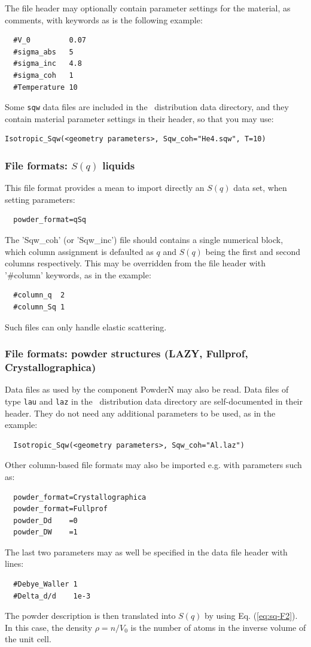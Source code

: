 The file header may optionally contain parameter settings for the material, as comments, with keywords as is the following example:
\begin{verbatim}
  #V_0         0.07
  #sigma_abs   5
  #sigma_inc   4.8
  #sigma_coh   1
  #Temperature 10
\end{verbatim}
Some \verb+sqw+ data files are included in the \MCS\ distribution data directory, and they contain material parameter settings in their header, so that you may use:
\begin{verbatim}
Isotropic_Sqw(<geometry parameters>, Sqw_coh="He4.sqw", T=10)
\end{verbatim}

\subsubsection{File formats: $S(q)$ liquids}

This file format provides a mean to import directly an $S(q)$ data set, when setting parameters:
\begin{verbatim}
  powder_format=qSq
\end{verbatim}
The 'Sqw\_coh' (or 'Sqw\_inc') file should contains a single numerical block, which column assignment is defaulted as $q$ and $S(q)$ being the first and second columns respectively. This may be overridden from the file header with '\#column' keywords, as in the example:
\begin{verbatim}
  #column_q  2
  #column_Sq 1
\end{verbatim}
Such files can only handle elastic scattering.

\subsubsection{File formats: powder structures (LAZY, Fullprof, Crystallographica)}

Data files as used by the component PowderN may also be read. Data files of type \verb'lau' and \verb'laz' in the \MCS\ distribution data directory are self-documented in their header. They do not need any additional parameters to be used, as in the example:
\begin{verbatim}
  Isotropic_Sqw(<geometry parameters>, Sqw_coh="Al.laz")
\end{verbatim}
Other column-based file formats may also be imported e.g. with parameters such as:
\begin{verbatim}
  powder_format=Crystallographica
  powder_format=Fullprof
  powder_Dd    =0
  powder_DW    =1
\end{verbatim}
The last two parameters may as well be specified in the data file header with lines:
\begin{verbatim}
  #Debye_Waller 1
  #Delta_d/d    1e-3
\end{verbatim}
The powder description is then translated into $S(q)$ by using Eq. (\ref{eq:sq-F2}).
In this case, the density $\rho = n/V_0$ is the number of atoms in the inverse volume of the unit cell.

